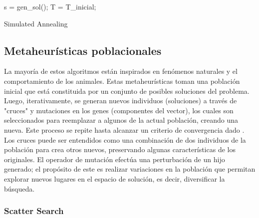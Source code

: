 \documentclass{ci5652}
\begin{document}
\begin{algorithm}
 \DontPrintSemicolon
 \vspace*{0.1cm}
  s = gen\_sol();\;
  T = T\_inicial;\;
 \vspace*{0.1cm}
 \caption{Simulated Annealing}
\end{algorithm}


\subsection{Metaheurísticas poblacionales}

La mayoría de estos algoritmos están inspirados en fenómenos naturales y el
comportamiento de los animales. Estas metaheurísticas toman una población
inicial que está constituida por un conjunto de posibles soluciones del
problema. Luego, iterativamente, se generan nuevos individuos (soluciones) a
través de "cruces" y mutaciones en los genes (componentes del vector), los
cuales son seleccionados para reemplazar a algunos de la actual población,
creando una nueva. Este proceso se repite hasta alcanzar un criterio de
convergencia dado \cite{Talbi_2009}.\\

Los cruces puede ser entendidos como una combinación de dos individuos de la
población para crea otros nuevos, preservando algunas características de los
originales. El operador de mutación efectúa una perturbación de un hijo
generado; el propósito de este es realizar variaciones en la población que
permitan explorar nuevos lugares en el espacio de solución, es decir,
diversificar la búsqueda.


\subsubsection{Scatter Search}
\end{document}
